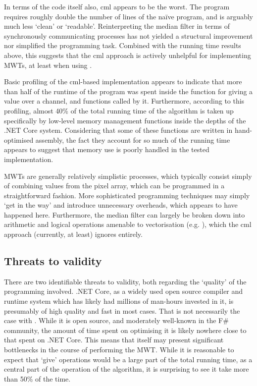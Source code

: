 In terms of the code itself also, \gls{cml} appears to be the worst.  The program requires roughly double the number of lines of the naïve program, and is arguably much less `clean' or `readable'.  Reinterpreting the median filter in terms of synchronously communicating processes has not yielded a structural improvement nor simplified the programming task.  Combined with the running time results above, this suggests that the \gls{cml} approach is actively unhelpful for implementing MWTs, at least when using \hopac{}.

Basic profiling of the \gls{cml}-based implementation appears to indicate that more than half of the runtime of the program was spent inside the function for giving a value over a channel, and functions called by it.  Furthermore, according to this profiling, almost 40\% of the total running time of the algorithm is taken up specifically by low-level memory management functions inside the depths of the .NET Core system.  Considering that some of these functions are written in hand-optimised assembly, the fact they account for so much of the running time appears to suggest that memory use is poorly handled in the tested implementation.

MWTs are generally relatively simplistic processes, which typically consist simply of combining values from the pixel array, which can be programmed in a straightforward fashion.  More sophisticated programming techniques may simply `get in the way' and introduce unnecessary overheads, which appears to have happened here.  Furthermore, the median filter can largely be broken down into arithmetic and logical operations amenable to vectorisation (e.g. \cite{Sanchez2012,Perreault2007}), which the \gls{cml} approach (currently, at least) ignores entirely.

\subsection{Threats to validity}
There are two identifiable threats to validity, both regarding the `quality' of the programming involved.  .NET Core, as a widely used open source compiler and runtime system which has likely had millions of man-hours invested in it, is presumably of high quality and fast in most cases.  That is not necessarily the case with \hopac{}.  While it is open source, and moderately well-known in the F\# community, the amount of time spent on optimising it is likely nowhere close to that spent on .NET Core.  This means that \hopac{} itself may present significant bottlenecks in the course of performing the MWT.  While it is reasonable to expect that `give' operations would be a large part of the total running time, as a central part of the operation of the algorithm, it is surprising to see it take more than 50\% of the time.

